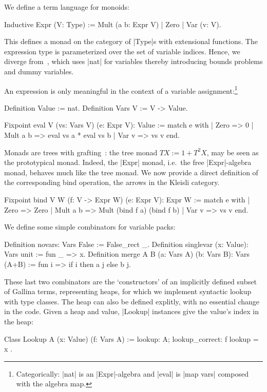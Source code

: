 \documentclass[a4paper,10pt,runningheads]{llncs}
\begin{document}
We define a term language for monoids:
\begin{code}
Inductive Expr (V: Type) := Mult (a b: Expr V) | Zero | Var (v: V).
\end{code}
This defines a monad on the category of |Type|s with extensional functions.
The expression type is parameterized over the set of variable indices. Hence, we diverge
 from~\cite{Hints}, which uses |nat| for variables thereby introducing bounds problems and
 dummy variables.

\noindent An expression is only meaningful in the context of a variable
assignment:\footnote{Categorically: |nat| is
an |Expr|-algebra and |eval| is |map vars| composed with the algebra map.}
\begin{code}
Definition Value := nat.
Definition Vars V := V -> Value.

Fixpoint eval {V} (vs: Vars V) (e: Expr V): Value :=
  match e with
  | Zero => 0
  | Mult a b => eval vs a * eval vs b
  | Var v => vs v
  end.
\end{code}
%
Monads are trees with grafting~\cite{MonadsGrafting}: the tree monad
$TX:=1+T^2X$, may be seen as the prototypical monad. Indeed, the |Expr| monad, i.e.\ the free
|Expr|-algebra monad, behaves much like the tree monad. We now provide a direct definition of the
corresponding bind operation, the arrows in the Kleisli category.

\begin{code}
Fixpoint bind {V W} (f: V -> Expr W) (e: Expr V): Expr W :=
  match e with
  | Zero => Zero
  | Mult a b => Mult (bind f a) (bind f b)
  | Var v => vs v
  end.
\end{code}


\noindent We define some simple combinators for variable packs:
%
\begin{code}
Definition novars: Vars False := False_rect _.
Definition singlevar (x: Value): Vars unit := fun _ => x.
Definition merge {A B} (a: Vars A) (b: Vars B): Vars (A+B) :=
  fun i => if i then a j else b j.
\end{code}

\noindent These last two combinators are the `constructors' of an implicitly defined subset of
 Gallina terms, representing heaps, for which we implement syntactic lookup with type classes.
The heap can also be defined explitly, with no essential change in the code.
Given a heap and value, |Lookup| instances give the value's index in the heap:
\begin{code}
  Class Lookup {A} (x: Value) (f: Vars A) :=
    { lookup: A; lookup_correct: f lookup = x }.
\end{code}
\end{document}
